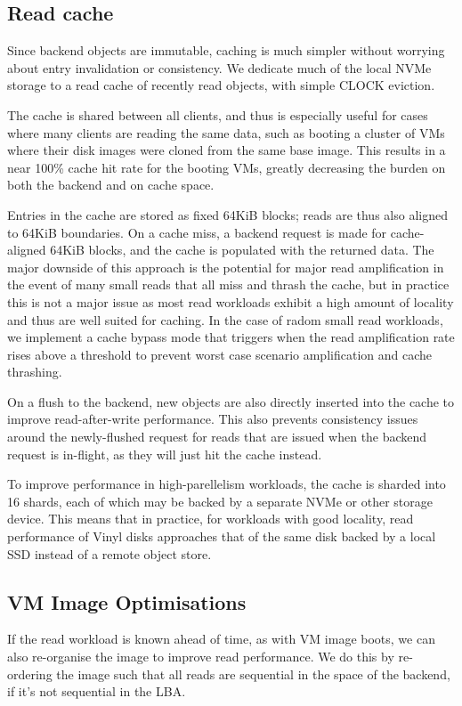 \subsection{Read cache}

Since backend objects are immutable, caching is much simpler without worrying
about entry invalidation or consistency. We dedicate much of the local NVMe
storage to a read cache of recently read objects, with simple CLOCK eviction.

The cache is shared between all clients, and thus is especially useful for cases
where many clients are reading the same data, such as booting a cluster of VMs
where their disk images were cloned from the same base image. This results in a
near 100\% cache hit rate for the booting VMs, greatly decreasing the burden on
both the backend and on cache space.

Entries in the cache are stored as fixed 64KiB blocks; reads are thus also
aligned to 64KiB boundaries. On a cache miss, a backend request is made for
cache-aligned 64KiB blocks, and the cache is populated with the returned data.
The major downside of this approach is the potential for major read
amplification in the event of many small reads that all miss and thrash the
cache, but in practice this is not a major issue as most read workloads exhibit
a high amount of locality and thus are well suited for caching. In the case
of radom small read workloads, we implement a cache bypass mode that triggers
when the read amplification rate rises above a threshold to prevent worst case
scenario amplification and cache thrashing.

On a flush to the backend, new objects are also directly inserted into the cache
to improve read-after-write performance. This also prevents consistency issues
around the newly-flushed request for reads that are issued when the backend
request is in-flight, as they will just hit the cache instead.

To improve performance in high-parellelism workloads, the cache is sharded into
16 shards, each of which may be backed by a separate NVMe or other storage
device. This means that in practice, for workloads with good locality, read
performance of Vinyl disks approaches that of the same disk backed by a local
SSD instead of a remote object store.

\subsection{VM Image Optimisations}

If the read workload is known ahead of time, as with VM image boots, we can also
re-organise the image to improve read performance. We do this by re-ordering the
image such that all reads are sequential in the space of the backend, if it's
not sequential in the LBA.

